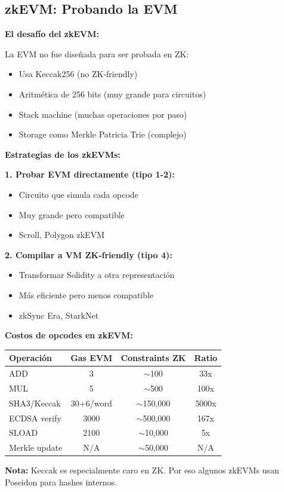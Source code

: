 \documentclass[11pt,a4paper,twoside,openright]{book}
\theoremstyle{definition}
\theoremstyle{plain}
\theoremstyle{remark}
\begin{document}
\subsection{zkEVM: Probando la EVM}

\begin{keyidea}
\textbf{El desafío del zkEVM:}

La EVM no fue diseñada para ser probada en ZK:
\begin{itemize}
    \item Usa Keccak256 (no ZK-friendly)
    \item Aritmética de 256 bits (muy grande para circuitos)
    \item Stack machine (muchas operaciones por paso)
    \item Storage como Merkle Patricia Trie (complejo)
\end{itemize}

\textbf{Estrategias de los zkEVMs:}

\textbf{1. Probar EVM directamente (tipo 1-2):}
\begin{itemize}
    \item Circuito que simula cada opcode
    \item Muy grande pero compatible
    \item Scroll, Polygon zkEVM
\end{itemize}

\textbf{2. Compilar a VM ZK-friendly (tipo 4):}
\begin{itemize}
    \item Transformar Solidity a otra representación
    \item Más eficiente pero menos compatible
    \item zkSync Era, StarkNet
\end{itemize}
\end{keyidea}

\begin{mathnote}
\textbf{Costos de opcodes en zkEVM:}

\begin{center}
\begin{tabular}{lccc}
\toprule
\textbf{Operación} & \textbf{Gas EVM} & \textbf{Constraints ZK} & \textbf{Ratio} \\
\midrule
ADD & 3 & $\sim$100 & 33x \\
MUL & 5 & $\sim$500 & 100x \\
SHA3/Keccak & 30+6/word & $\sim$150,000 & 5000x \\
ECDSA verify & 3000 & $\sim$500,000 & 167x \\
SLOAD & 2100 & $\sim$10,000 & 5x \\
Merkle update & N/A & $\sim$50,000 & N/A \\
\bottomrule
\end{tabular}
\end{center}

\textbf{Nota:} Keccak es especialmente caro en ZK. Por eso algunos zkEVMs usan Poseidon para hashes internos.
\end{mathnote}
\end{document}
